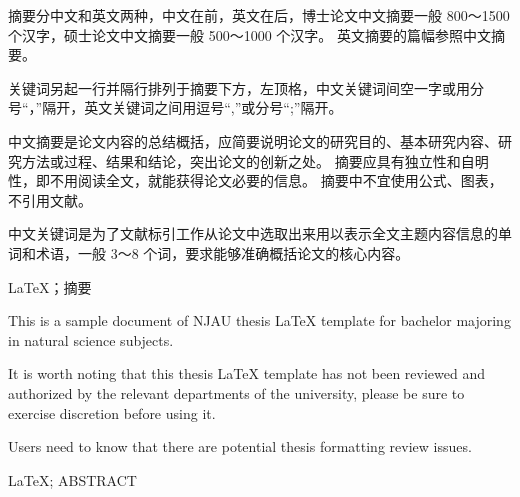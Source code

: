 \begin{cnabstract}
    摘要分中文和英文两种，中文在前，英文在后，博士论文中文摘要一般 800～1500 个汉字，硕士论文中文摘要一般 500～1000 个汉字。
    英文摘要的篇幅参照中文摘要。

    关键词另起一行并隔行排列于摘要下方，左顶格，中文关键词间空一字或用分号“，”隔开，英文关键词之间用逗号“,”或分号“;”隔开。

    中文摘要是论文内容的总结概括，应简要说明论文的研究目的、基本研究内容、研究方法或过程、结果和结论，突出论文的创新之处。
    摘要应具有独立性和自明性，即不用阅读全文，就能获得论文必要的信息。
    摘要中不宜使用公式、图表，不引用文献。

    中文关键词是为了文献标引工作从论文中选取出来用以表示全文主题内容信息的单词和术语，一般 3～8 个词，要求能够准确概括论文的核心内容。
    \begin{cnkeywords}
        LaTeX；摘要
    \end{cnkeywords}
\end{cnabstract}

\begin{enabstract}
    This is a sample document of NJAU thesis \LaTeX{} template for bachelor majoring in natural science subjects.

    It is worth noting that this thesis \LaTeX{} template has not been reviewed and authorized by the relevant departments of the university, please be sure to exercise discretion before using it.

    Users need to know that there are potential thesis formatting review issues.
    \begin{enkeywords}
        LaTeX; ABSTRACT
    \end{enkeywords}
\end{enabstract}